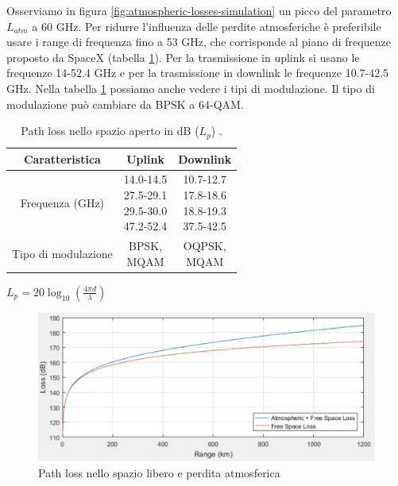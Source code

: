 Osserviamo in figura \ref{fig:atmospheric-losses-simulation} un picco del parametro $L_{atm}$ a 60 GHz.
Per ridurre l'influenza delle perdite atmosferiche è preferibile usare i range di frequenza fino a 53 GHz, che corrisponde al piano di frequenze proposto da SpaceX (tabella \ref{tab:starlink-frequency-allocation-modulation-type}).
Per la trasmissione in uplink si usano le frequenze 14-52.4 GHz e per la trasmissione in downlink le frequenze 10.7-42.5 GHz.
Nella tabella \ref{tab:starlink-frequency-allocation-modulation-type} possiamo anche vedere i tipi di modulazione.
Il tipo di modulazione può cambiare da \ac{BPSK} a 64-\ac{QAM}.

\begin{table}[h]
\centering
\begin{tabular}{|c|c|c|}
\hline
\textbf{Caratteristica} & \textbf{Uplink} & \textbf{Downlink} \\ \hline
Frequenza (GHz)  & \makecell{14.0-14.5 \\ 27.5-29.1 \\ 29.5-30.0 \\ 47.2-52.4}  & \makecell{10.7-12.7\\17.8-18.6\\18.8-19.3\\37.5-42.5} \\ \hline
Tipo di modulazione  & \makecell{\ac{BPSK},\\M\ac{QAM}} & \makecell{\ac{OQPSK},\\M\ac{QAM}} \\ \hline
\end{tabular}
\caption{Path loss nello spazio aperto in dB ($L_p$) \cite{rozenvasser_estimation_2023}.}
\label{tab:starlink-frequency-allocation-modulation-type}
\end{table}

$L_p = 20 \log_{10} (\frac{4 \pi d}{\lambda})$

\begin{figure}[htbp]
  \centering
  \includegraphics[width=0.8\linewidth]{./res/img/free_space_path_loss_atm_loss.png}
  \caption{Path loss nello spazio libero e perdita atmosferica}
  \label{fig:free-space-path-loss-atm-loss}
\end{figure}

